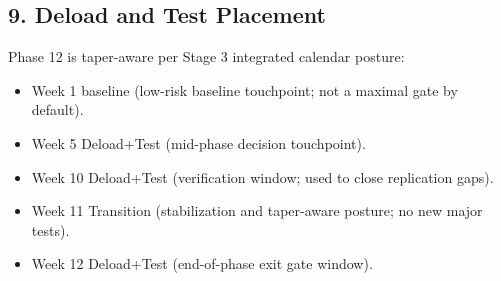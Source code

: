 \documentclass[10pt]{article}
\begin{document}
\begin{landscape}
\newpage

\subsection*{9. Deload and Test Placement}


Phase 12 is taper-aware per Stage 3 integrated calendar posture:

\begin{itemize}
\item Week 1 baseline (low-risk baseline touchpoint; not a maximal gate by default).
\item Week 5 Deload+Test (mid-phase decision touchpoint).
\item Week 10 Deload+Test (verification window; used to close replication gaps).
\item Week 11 Transition (stabilization and taper-aware posture; no new major tests).
\item Week 12 Deload+Test (end-of-phase exit gate window).
\end{itemize}

\end{landscape}
\end{document}
